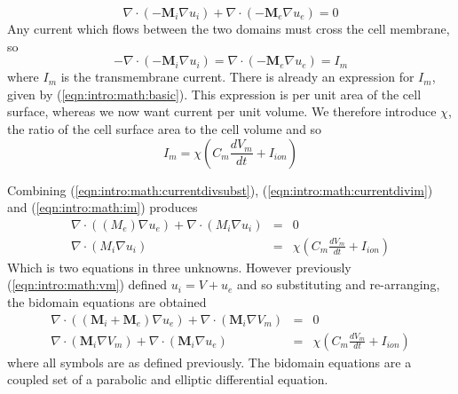 \begin{equation}
\label{eqn:intro:math:currentdivsubst}
\nabla \cdot \left(- \mathbf{M}_i \nabla u_i \right) + \nabla \cdot \left(-\mathbf{M}_e \nabla u_e \right) = 0
\end{equation}
Any current which flows between the two domains must cross the cell membrane, so
\begin{equation}
\label{eqn:intro:math:currentdivim}
- \nabla \cdot \left(- \mathbf{M}_i \nabla u_i \right) = \nabla \cdot \left(-\mathbf{M}_e \nabla u_e \right) = I_m
\end{equation}
where $I_m$ is the transmembrane current.
There is already an expression for $I_m$, given by (\ref{eqn:intro:math:basic}).
This expression is per unit area of the cell surface, whereas we now want current per unit volume.
We therefore introduce $\chi$, the ratio of the cell surface area to the cell volume and so
\begin{equation}
\label{eqn:intro:math:im}
I_m = \chi \left(C_{m}\frac{dV_{m}}{dt} + I_{ion}\right)
\end{equation}

Combining (\ref{eqn:intro:math:currentdivsubst}),
(\ref{eqn:intro:math:currentdivim}) and (\ref{eqn:intro:math:im}) produces
\begin{subequations}
\label{eqn:intro:math:bidom3}
\begin{align}
\nabla\cdot\left(\left(M_{e}\right)\nabla u_{e}\right) + \nabla\cdot\left(M_{i}\nabla u_{i}\right) &=& 0
\label{eqn:intro:math:bidom31}\\
\nabla\cdot\left(M_{i}\nabla u_{i}\right) &=& \chi \left(C_{m}\frac{dV_{m}}{dt} + I_{ion}\right)
\label{eqn:intro:math:bidom32}
\end{align}
\end{subequations}
Which is two equations in three unknowns.  However previously
(\ref{eqn:intro:math:vm}) defined $u_i = V + u_e$ and so substituting and
re-arranging, the bidomain equations are obtained
\begin{subequations}
\label{eqn:intro:math:bidom}
\begin{align}
\nabla\cdot\left(\left(\mathbf{M}_{i}+\mathbf{M}_{e}\right)\nabla u_{e}\right) + \nabla\cdot\left( \mathbf{M}_{i}\nabla V_{m}\right) &=& 0
\label{eqn:intro:math:bidom1}\\
\nabla\cdot\left(\mathbf{M}_{i}\nabla V_{m}\right) + \nabla\cdot\left(\mathbf{M}_{i}\nabla u_{e}\right) &=& \chi \left(C_{m}\frac{dV_{m}}{dt} + I_{ion}\right)
\label{eqn:intro:math:bidom2}
\end{align}
\end{subequations}
where all symbols are as defined previously.
The bidomain equations are a coupled set of a parabolic and elliptic differential equation.

